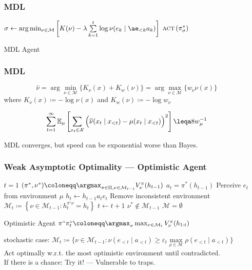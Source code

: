 \documentclass[UTF8,11pt,colorlinks,compress,openany]{beamer}%
\begin{document}
\begin{frame}\frametitle{MDL}
\begin{algorithm}[H]
\begin{algorithmic}[1]
\Loop
\State $\sigma\gets\arg\min_{\nu\in\mathcal{M}}\left[K(\nu) - \lambda\sum\limits_{k=1}^{t}\log\nu(e_k\mid\ae_{<k}a_k)\right]$
\State $\textsc{act}\left(\pi_{\sigma}^*\right)$
\EndLoop
\end{algorithmic}
\caption{MDL Agent}\label{alg:mdl}
\end{algorithm}
\end{frame}

\begin{frame}\frametitle{MDL}
\setlength\abovedisplayskip{0pt}
\setlength\belowdisplayskip{0pt}
	\begin{definition}[MDL]
		\[ \widehat{\nu}=\arg\min\limits_{\nu\in\mathcal{M}}\{K_\nu(x)+K_w(\nu)\}=\arg\max\limits_{\nu\in\mathcal{M}}\{w_\nu \nu(x)\}\]
		where $K_\nu(x)\coloneqq -\log\nu(x)$ and $K_w(\nu)\coloneqq -\log w_\nu$
	\end{definition}
	\begin{theorem}
		\begin{gather*}
		\sum\limits_{t=1}^\infty\mathbb{E}_\mu\left[\sum\limits_{x_t\in\mathcal{X}}\Big(\widehat{\nu}(x_t\mid x_{<t})-\mu(x_t\mid x_{<t})\Big)^2\right]
		\leqa 8w_\mu^{-1}
		\end{gather*}
	\end{theorem}
	MDL converges, but speed can be exponential worse than Bayes.
\end{frame}

\begin{frame}\frametitle{Weak Asymptotic Optimality --- Optimistic Agent}\vspace{-1ex}
\begin{algorithm}[H]
\begin{algorithmic}[1]
\State $t=1$
\Repeat
\State $(\pi^*,\nu^*)\coloneqq \argmax_{\pi\in\Pi,\nu\in\mathcal{M}_{t-1}}V_\nu^\pi(h_{t-1})$
 \Repeat
 \State $a_t=\pi^*(h_{t-1})$
 \State Perceive $e_t$ from environment $\mu$
 \State $h_t\gets h_{t-1}a_te_t$
 \State Remove inconsistent environment $\mathcal{M}_t\coloneqq \left\{\nu\in\mathcal{M}_{t-1}: h_t^{\pi^\circ\nu}=h_t\right\}$
 \State $t\gets t+1$
 \Until $\nu^*\notin\mathcal{M}_{t-1}$
\Until $\mathcal{M}=\emptyset$
\end{algorithmic}
\caption{Optimistic Agent $\pi^\circ \hfill \pi_t^\circ\coloneqq \argmax_\pi\max_{\nu\in\mathcal{M}_t} V_\nu^\pi(h_{1:t})$}\label{alg:optimistic}
\end{algorithm}\vspace{-1ex}
	stochastic case: $\mathcal{M}_t\coloneqq \Big\{\nu\in\mathcal{M}_{t-1}: \nu(e_{<t}\mid a_{<t})\geq\varepsilon_t\max\limits_{\rho\in\mathcal{M}}\rho(e_{<t}\mid a_{<t})\Big\}$\\
	Act optimally w.r.t. the most optimistic environment until contradicted.\\
	If there is a chance: Try it! --- Vulnerable to traps.
\end{frame}
\end{document}
